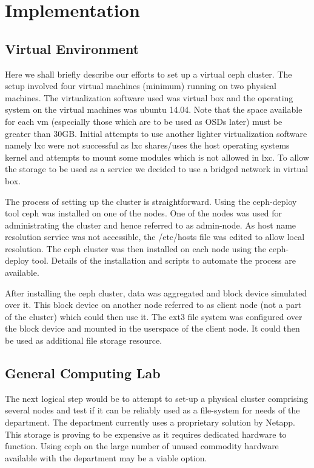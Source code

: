 \documentclass[a4paper,10pt]{article}
\begin{document}
\newpage
\section{Implementation}
\subsection{Virtual Environment}

    Here we shall briefly describe our efforts to set up a virtual ceph cluster. The setup involved four virtual machines (minimum) running on two physical machines. The virtualization software used was virtual box and the operating system on the virtual machines was ubuntu 14.04. Note that the space available for each vm (especially those which are to be used as OSDs later) must be greater than 30GB. Initial attempts to use another lighter virtualization software namely lxc were not successful as lxc shares/uses the host operating systems kernel and attempts to mount some modules which is not allowed in lxc. To allow the storage to be used as a service we decided to use a bridged network in virtual box.


    The process of setting up the cluster is straightforward. Using the ceph-deploy tool ceph was installed on one of the nodes. One of the nodes was used for administrating the cluster and hence referred to as admin-node. As host name resolution service was not accessible, the /etc/hosts file was edited to allow local resolution. The ceph cluster was then installed on each node using the ceph-deploy tool. Details of the installation and scripts to automate the process are available.
    
    After installing the ceph cluster, data was aggregated and block device simulated over it. This block device on another node referred to as client node (not a part of the cluster) which could then use it. The ext3 file system was configured over the block device and mounted in the userspace of the client node. It could then be used as additional file storage resource.

\subsection{General Computing Lab}    
    The next logical step would be to attempt to set-up a physical cluster comprising several nodes and test if it can be reliably used as a file-system for needs of the department. The department currently uses a proprietary solution by Netapp. This storage is proving to be expensive as it requires dedicated hardware to function. Using ceph on the large number of unused commodity hardware available with the department may be a viable option.
    
\end{document}
